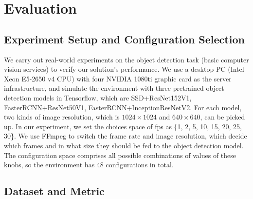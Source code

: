 \section{Evaluation}
\label{Section: experiment}

\subsection{Experiment Setup and Configuration Selection}
\label{subsec: configuration}
We carry out real-world experiments on the object detection task (basic computer vision services) to verify our solution’s performance. We use a desktop PC (Intel Xeon E5-2650 v4 CPU) with four NVIDIA 1080ti graphic card as the server infrastructure, and simulate the environment \cite{trade-offs} with three pretrained object detection models in Tensorflow, which are SSD+ResNet152V1, FasterRCNN+ResNet50V1, FasterRCNN+InceptionResNetV2. For each model, two kinds of image resolution, which is $1024\times1024$ and $640\times640$, can be picked up. In our experiment, we set the choices space of fps as \{1, 2, 5, 10, 15, 20, 25, 30\}. We use FFmpeg to switch the frame rate and image resolution, which decide which frames and in what size they should be fed to the object detection model. The configuration space comprises all possible combinations of values of these knobs, so the environment has 48 configurations in total.


\subsection{Dataset and Metric}
\label{subsec: datasets}


